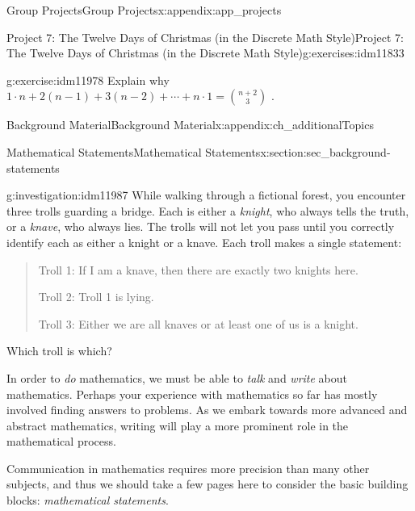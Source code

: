 \documentclass[oneside,10pt,]{book}
\numberwithin{equation}{chapter}
\begin{document}
\begin{appendixptx}{Group Projects}{}{Group Projects}{}{}{x:appendix:app_projects}
\begin{exercises-section-numberless}{Project 7: The Twelve Days of Christmas (in the Discrete Math Style)}{}{Project 7: The Twelve Days of Christmas (in the Discrete Math Style)}{}{}{g:exercises:idm11833}
\begin{divisionexercise}{6}{}{}{g:exercise:idm11978}%
Explain why \(1 \cdot n + 2\left( n - 1 \right) + 3\left( n - 2 \right) + \cdots + n \cdot 1 =
\binom{n + 2}{3}\) .%
\end{divisionexercise}%
\end{exercises-section-numberless}
\end{appendixptx}
%
%
\typeout{************************************************}
\typeout{************************************************}
%
\begin{appendixptx}{Background Material}{}{Background Material}{}{}{x:appendix:ch_additionalTopics}
%
%
\typeout{************************************************}
\typeout{************************************************}
%
\begin{sectionptx}{Mathematical Statements}{}{Mathematical Statements}{}{}{x:section:sec_background-statements}
\begin{introduction}{}%
\begin{investigation}{}{g:investigation:idm11987}%
While walking through a fictional forest, you encounter three trolls guarding a bridge. Each is either a \emph{knight}, who always tells the truth, or a \emph{knave}, who always lies. The trolls will not let you pass until you correctly identify each as either a knight or a knave. Each troll makes a single statement:%
\begin{quote}%
Troll 1: If I am a knave, then there are exactly two knights here.%
\par
Troll 2: Troll 1 is lying.%
\par
Troll 3: Either we are all knaves or at least one of us is a knight.%
\end{quote}
Which troll is which?  %
\end{investigation}
In order to \emph{do} mathematics, we must be able to \emph{talk} and \emph{write} about mathematics. Perhaps your experience with mathematics so far has mostly involved finding answers to problems. As we embark towards more advanced and abstract mathematics, writing will play a more prominent role in the mathematical process.%
\par
Communication in mathematics requires more precision than many other subjects, and thus we should take a few pages here to consider the basic building blocks: \emph{mathematical statements}.%

\end{introduction}
\end{sectionptx}
\end{appendixptx}
\end{document}
